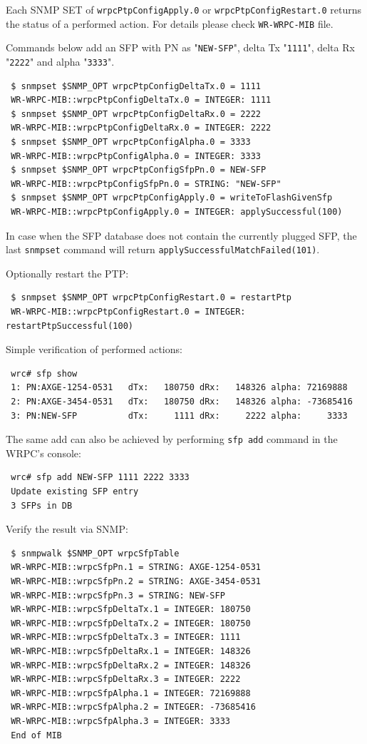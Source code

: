 \documentclass[a4paper, 12pt]{article}
\renewcommand{\_}{\underscore\allowbreak}
\begin{document}
Each SNMP SET of \texttt{wrpcPtpConfigApply.0} or \texttt{wrpcPtpConfigRestart.0} returns
the status of a performed action. For details please check \texttt{WR-WRPC-MIB}
file.

Commands below add an SFP with PN as "\texttt{NEW-SFP}", delta Tx "\texttt{1111}",
delta Rx "\texttt{2222}" and alpha "\texttt{3333}".
\begin{lstlisting}
 $ snmpset $SNMP_OPT wrpcPtpConfigDeltaTx.0 = 1111
 WR-WRPC-MIB::wrpcPtpConfigDeltaTx.0 = INTEGER: 1111
 $ snmpset $SNMP_OPT wrpcPtpConfigDeltaRx.0 = 2222
 WR-WRPC-MIB::wrpcPtpConfigDeltaRx.0 = INTEGER: 2222
 $ snmpset $SNMP_OPT wrpcPtpConfigAlpha.0 = 3333
 WR-WRPC-MIB::wrpcPtpConfigAlpha.0 = INTEGER: 3333
 $ snmpset $SNMP_OPT wrpcPtpConfigSfpPn.0 = NEW-SFP
 WR-WRPC-MIB::wrpcPtpConfigSfpPn.0 = STRING: "NEW-SFP"
 $ snmpset $SNMP_OPT wrpcPtpConfigApply.0 = writeToFlashGivenSfp
 WR-WRPC-MIB::wrpcPtpConfigApply.0 = INTEGER: applySuccessful(100)
\end{lstlisting}

In case when the SFP database does not contain the currently plugged SFP, the last
\texttt{snmpset} command will return \texttt{applySuccessfulMatchFailed(101)}.

Optionally restart the PTP:
\begin{lstlisting}
 $ snmpset $SNMP_OPT wrpcPtpConfigRestart.0 = restartPtp
 WR-WRPC-MIB::wrpcPtpConfigRestart.0 = INTEGER: restartPtpSuccessful(100)
\end{lstlisting}

Simple verification of performed actions:\\
\begin{minipage}{\textwidth}
\begin{lstlisting}
 wrc# sfp show
 1: PN:AXGE-1254-0531   dTx:   180750 dRx:   148326 alpha: 72169888
 2: PN:AXGE-3454-0531   dTx:   180750 dRx:   148326 alpha: -73685416
 3: PN:NEW-SFP          dTx:     1111 dRx:     2222 alpha:     3333
\end{lstlisting}
\end{minipage}

The same add can also be achieved by performing \texttt{sfp add} command in
the WRPC's console:
\begin{lstlisting}
 wrc# sfp add NEW-SFP 1111 2222 3333
 Update existing SFP entry
 3 SFPs in DB
\end{lstlisting}

Verify the result via SNMP:
\begin{lstlisting}
 $ snmpwalk $SNMP_OPT wrpcSfpTable
 WR-WRPC-MIB::wrpcSfpPn.1 = STRING: AXGE-1254-0531
 WR-WRPC-MIB::wrpcSfpPn.2 = STRING: AXGE-3454-0531
 WR-WRPC-MIB::wrpcSfpPn.3 = STRING: NEW-SFP
 WR-WRPC-MIB::wrpcSfpDeltaTx.1 = INTEGER: 180750
 WR-WRPC-MIB::wrpcSfpDeltaTx.2 = INTEGER: 180750
 WR-WRPC-MIB::wrpcSfpDeltaTx.3 = INTEGER: 1111
 WR-WRPC-MIB::wrpcSfpDeltaRx.1 = INTEGER: 148326
 WR-WRPC-MIB::wrpcSfpDeltaRx.2 = INTEGER: 148326
 WR-WRPC-MIB::wrpcSfpDeltaRx.3 = INTEGER: 2222
 WR-WRPC-MIB::wrpcSfpAlpha.1 = INTEGER: 72169888
 WR-WRPC-MIB::wrpcSfpAlpha.2 = INTEGER: -73685416
 WR-WRPC-MIB::wrpcSfpAlpha.3 = INTEGER: 3333
 End of MIB
\end{lstlisting}
\end{document}
